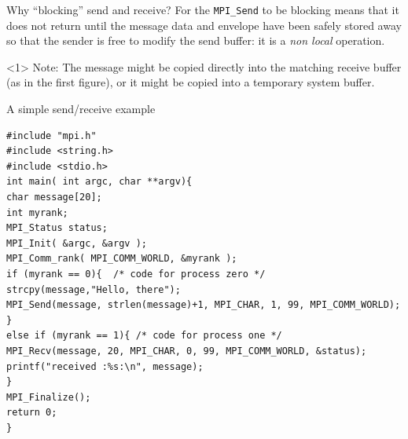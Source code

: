 \documentclass[xcolor={svgnames,usenames}]{beamer}
\begin{document}
\begin{frame}{Why ``blocking'' send and receive?}
For the \texttt{MPI_Send} to be \alert{blocking} means that it does not return until the message
data and envelope have been safely stored away so that the sender is free to modify the
send buffer: it is a \emph{non local} operation. 
\vfill
\begin{onlyenv}<1>
\alert{Note:} The message might be copied directly into the matching receive buffer (as in the first figure), or it
might be copied into a temporary system buffer.
\begin{center}
\end{center}
\end{onlyenv}
\end{frame}

\begin{frame}[fragile]{A simple send/receive example}
\footnotesize
\begin{verbatim}
#include "mpi.h"
#include <string.h>
#include <stdio.h>
int main( int argc, char **argv){
char message[20];
int myrank;
MPI_Status status;
MPI_Init( &argc, &argv );
MPI_Comm_rank( MPI_COMM_WORLD, &myrank );
if (myrank == 0){  /* code for process zero */
strcpy(message,"Hello, there");
MPI_Send(message, strlen(message)+1, MPI_CHAR, 1, 99, MPI_COMM_WORLD);
}
else if (myrank == 1){ /* code for process one */
MPI_Recv(message, 20, MPI_CHAR, 0, 99, MPI_COMM_WORLD, &status);
printf("received :%s:\n", message);
}
MPI_Finalize();
return 0;
}
\end{verbatim}
\end{frame}
\end{document}
